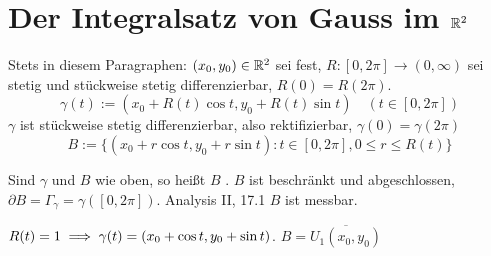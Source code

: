 \documentclass[a4paper,twoside,DIV15,BCOR12mm]{scrbook}
\begin{document}
\chapter{Der Integralsatz von Gauss im $\mathbb{R}^2$}

Stets in diesem Paragraphen: $(x_0,y_0) \in \mathbb{R}^2$ sei fest, $R:[0,2\pi] \to (0,\infty)$ sei stetig und stückweise stetig differenzierbar, $R(0) = R(2\pi)$.
\[ \gamma(t) := (x_0 + R(t)\cos t, y_0 + R(t) \sin t) \quad (t\in[0,2\pi]) \]
$\gamma$ ist stückweise stetig differenzierbar, also rektifizierbar, $\gamma(0) = \gamma(2\pi)$
\[ B:= \{ (x_0+r\cos t, y_0+ r\sin t) : t\in[0,2\pi], 0\le r\le R(t) \} \]


Sind $\gamma$ und $B$ wie oben, so heißt $B$ . $B$ ist beschränkt und abgeschlossen, $\partial B = \Gamma_\gamma = \gamma([0,2\pi])$. Analysis II, 17.1 \folgt $B$ ist messbar.

\begin{beispiel}
$R(t) = 1 \implies \gamma(t) = (x_0 + \cos t, y_0 + \sin t)$. $B= \overline{U_1(x_0,y_0)}$
\end{beispiel}
\end{document}
